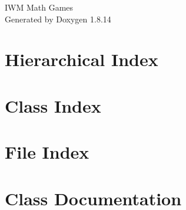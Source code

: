 \documentclass[twoside]{book}
\newcommand{\+}{\discretionary{\mbox{\scriptsize$\hookleftarrow$}}{}{}}
\newcommand{\clearemptydoublepage}{%
  \newpage{\pagestyle{empty}\cleardoublepage}%
}
\begin{document}
\hypersetup{pageanchor=false,
             bookmarksnumbered=true,
             pdfencoding=unicode
            }
\begin{titlepage}
\vspace*{7cm}
\begin{center}%
{\Large I\+WM Math Games }\\
\vspace*{1cm}
{\large Generated by Doxygen 1.8.14}\\
\end{center}
\end{titlepage}
\clearemptydoublepage
{}
\tableofcontents
\clearemptydoublepage
{}
\hypersetup{pageanchor=true}

\chapter{Hierarchical Index}

\chapter{Class Index}

\chapter{File Index}

\chapter{Class Documentation}








































\end{document}
